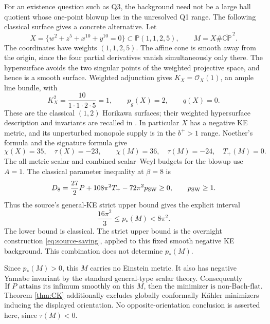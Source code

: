 \documentclass[11pt,a4paper]{article}
\numberwithin{equation}{section}
\theoremstyle{definition}\newtheorem{hypothesis}[theorem]{Input}
\theoremstyle{remark}\newtheorem{remark}[theorem]{Remark}
\newcommand{\CP}{\mathbb{CP}}
\begin{document}
For an existence question such as Q3, the background need not be a large
ball quotient whose one-point blowup lies in the unresolved Q1 range.
The following classical surface gives a concrete alternative.
Let
\begin{equation}\label{eq:Horikawa}
 X=\{w^2+z^5+x^{10}+y^{10}=0\}
 \subset\mathbb P(1,1,2,5),\qquad M=X\#\overline{\CP}^{\,2}.
\end{equation}
The coordinates have weights $(1,1,2,5)$.  The affine cone is smooth away
from the origin, since the four partial derivatives vanish simultaneously
only there.  The hypersurface avoids the two singular points of the weighted
projective space, and hence is a smooth surface.  Weighted adjunction gives
$K_X=\mathcal O_X(1)$, an ample line bundle, with
\[
 K_X^2=\frac{10}{1\cdot1\cdot2\cdot5}=1,\qquad p_g(X)=2,\qquad q(X)=0.
\]
These are the classical $(1,2)$ Horikawa surfaces; their weighted
hypersurface description and invariants are recalled in
\cite[Introduction]{CP}.  In particular $X$ has a negative KE metric, and
its unperturbed monopole supply is in the $b^+>1$ range.
Noether's formula and the signature formula give
\begin{equation}
 \chi(X)=35,\quad\tau(X)=-23,\qquad
 \chi(M)=36,\quad\tau(M)=-24,\quad T_+(M)=0.
\end{equation}
The all-metric scalar and combined scalar--Weyl budgets for the blowup
use $A=1$.  The classical parameter inequality at $\beta=8$ is
\[
 D_8=\frac{27}{2}P+108\pi^2T_+-72\pi^2p_{\rm SW}\ge0,
 \qquad p_{\rm SW}\ge1.
\]
Thus the source's general-KE strict upper bound gives the explicit interval
\begin{equation}\label{eq:HorikawaWindow}
 \boxed{\frac{16\pi^2}{3}\le p_*(M)<8\pi^2.}
\end{equation}
The lower bound is classical.  The strict upper bound is the overnight
construction \eqref{eq:source-saving}, applied to this fixed smooth
negative KE background.  This combination does not determine $p_*(M)$.

Since $p_*(M)>0$, this $M$ carries no Einstein metric.  It also has negative
Yamabe invariant by the standard general-type scalar theory.  Consequently
\begin{equation}\label{eq:concrete-Q3}
 \boxed{\text{If $P$ attains its infimum smoothly on this $M$, then the
 minimizer is non-Bach-flat.}}
\end{equation}
Theorem \ref{thm:CK} additionally excludes globally conformally K\"ahler
minimizers inducing the displayed orientation.  No opposite-orientation
conclusion is asserted here, since $\tau(M)<0$.
\end{document}
